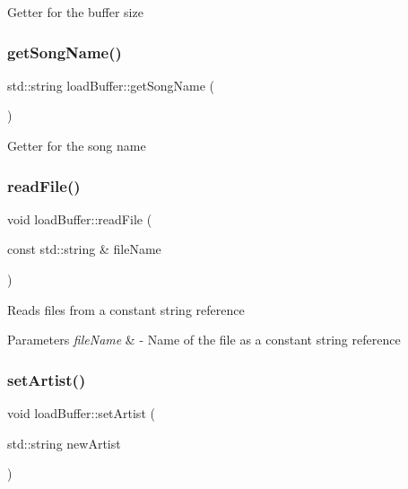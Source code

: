 Getter for the buffer size \mbox{\label{classloadBuffer_a99cbb74f6dd6f788b13abfc6916207cf}} 
\subsubsection{\texorpdfstring{get\+Song\+Name()}{getSongName()}}
{\footnotesize\ttfamily std\+::string load\+Buffer\+::get\+Song\+Name (\begin{DoxyParamCaption}{ }\end{DoxyParamCaption})}

Getter for the song name \mbox{\label{classloadBuffer_adfdc981dd37280f382467ecd6fb087c6}} 
\subsubsection{\texorpdfstring{read\+File()}{readFile()}}
{\footnotesize\ttfamily void load\+Buffer\+::read\+File (\begin{DoxyParamCaption}\item[{const std\+::string \&}]{file\+Name }\end{DoxyParamCaption})}

Reads files from a constant string reference 
\begin{DoxyParams}{Parameters}
{\em file\+Name} & -\/ Name of the file as a constant string reference \\
\hline
\end{DoxyParams}
\mbox{\label{classloadBuffer_a200dc532492d652badbc0db7e8cd7085}} 
\subsubsection{\texorpdfstring{set\+Artist()}{setArtist()}}
{\footnotesize\ttfamily void load\+Buffer\+::set\+Artist (\begin{DoxyParamCaption}\item[{std\+::string}]{new\+Artist }\end{DoxyParamCaption})}

